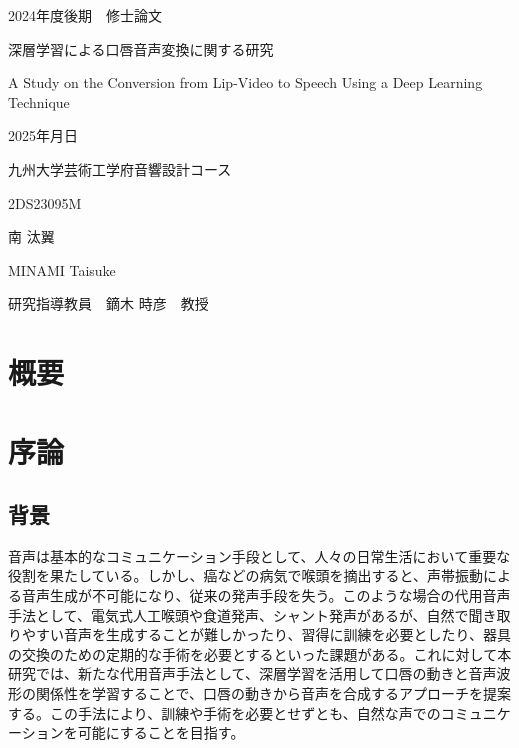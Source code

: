 \documentclass[12pt]{jarticle}
\numberwithin{equation}{section}    %
\numberwithin{figure}{section}      %
\numberwithin{table}{section}      %
\begin{document}
\begin{titlepage}
    \begin{center}
        {\Large 2024年度後期　修士論文}
        \vspace{120truept}

        {\huge 深層学習による口唇音声変換に関する研究}
        \vspace{30truept}

        {\huge A Study on the Conversion from Lip-Video to Speech Using a Deep Learning Technique}
        \vspace{120truept}

        {\Large 2025年月日}
        \vspace{10truept}

        {\Large 九州大学芸術工学府音響設計コース}
        \vspace{70truept}

        {\Large 2DS23095M}
        \vspace{10truept}

        {\Large 南 汰翼}
        \vspace{10truept}

        {\Large MINAMI Taisuke}
        \vspace{30truept}

        {\Large 研究指導教員　鏑木 時彦　教授}
    \end{center}
\end{titlepage}

\section*{概要}
\thispagestyle{empty}
\clearpage

\setcounter{tocdepth}{2}
\tableofcontents
\thispagestyle{empty}
\clearpage

\pagestyle{plain}
\setcounter{page}{1}

\section{序論}
\subsection{背景}
音声は基本的なコミュニケーション手段として、人々の日常生活において重要な役割を果たしている。しかし、癌などの病気で喉頭を摘出すると、声帯振動による音声生成が不可能になり、従来の発声手段を失う。このような場合の代用音声手法として、電気式人工喉頭や食道発声、シャント発声があるが、自然で聞き取りやすい音声を生成することが難しかったり、習得に訓練を必要としたり、器具の交換のための定期的な手術を必要とするといった課題がある。これに対して本研究では、新たな代用音声手法として、深層学習を活用して口唇の動きと音声波形の関係性を学習することで、口唇の動きから音声を合成するアプローチを提案する。この手法により、訓練や手術を必要とせずとも、自然な声でのコミュニケーションを可能にすることを目指す。
\end{document}
